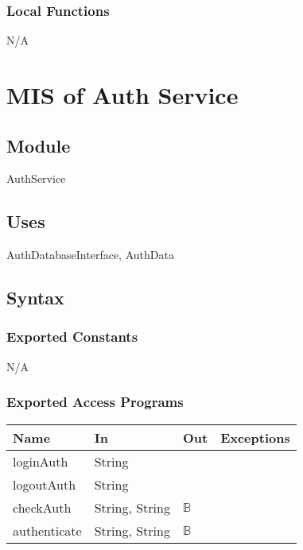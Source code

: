 \documentclass[12pt, titlepage]{article}
\begin{document}
	\subsubsection{Local Functions}
	
	N/A
	
	\newpage
	
	
	
	
	\section{MIS of Auth Service} \label{Module} 
	
	\subsection{Module}
	AuthService
	
	\subsection{Uses}
	AuthDatabaseInterface, AuthData
	
	\subsection{Syntax}
	
	\subsubsection{Exported Constants}
	N/A
	
	\subsubsection{Exported Access Programs}
	
	\begin{center}
		\begin{tabular}{l  l  l  l}
			\hline
			\textbf{Name} & \textbf{In} & \textbf{Out} & \textbf{Exceptions} \\
			\hline
			loginAuth & String & ~ & ~ \\
			\hline
			logoutAuth & String & ~ & ~ \\
			\hline
			checkAuth & String, String & $\mathbb{B}$ & ~ \\
			\hline
			authenticate & String, String & $\mathbb{B}$ & ~ \\
			\hline
		\end{tabular}
	\end{center}
	
\end{document}
